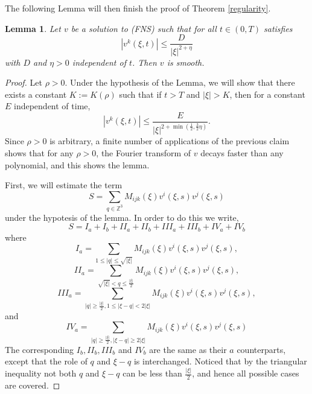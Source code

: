 \documentclass{amsart}
\newtheorem{lemma}{Lemma}
\begin{document}
The following Lemma will then finish the proof of Theorem \ref{regularity}.
\begin{lemma}
Let $v$ be a solution to (FNS) such that for all $t\in \left(0,T\right)$ satisfies
\[
\left|v^k\left(\xi,t\right)\right|\leq \frac{D}{\left|\xi\right|^{2+\eta}}
\]
with $D$ and $\eta>0$ independent of $t$. Then $v$ is smooth.
\end{lemma}
\begin{proof}
Let $\rho>0$. Under the hypothesis of the Lemma,
we will show that there exists a constant $K:=K\left(\rho\right)$ such that
if $t>T$ and $\left|\xi\right|>K$, then for a constant $E$ independent of time,
\[
\left|v^k\left(\xi,t\right)\right|\leq \frac{E}{\left|\xi\right|^{2+\min\left(\frac{1}{2},\frac{3}{2}\eta\right)}}.
\]
Since $\rho>0$ is arbitrary, a finite number of applications of the previous claim shows
that for any $\rho>0$, the Fourier transform of $v$ decays faster than any polynomial, and
this shows the lemma. 

First, we will estimate the term
\[
S=\sum_{q\in \mathbb{Z}^3} M_{ijk}\left(\xi\right)v^i\left(\xi,s\right)v^j\left(\xi,s\right)
\]
under the hypotesis of the lemma. In order to do this we write,
\[
S=I_a+I_b+II_a+II_b+III_a+III_b+IV_a+IV_b
\]
where
\begin{equation*}
I_a=\sum_{1\leq\left|q\right|\leq\sqrt{\left|\xi\right|}}M_{ijk}\left(\xi\right)v^i\left(\xi,s\right)v^j\left(\xi,s\right),
\end{equation*}
\begin{equation*}
II_a=\sum_{\sqrt{\left|\xi\right|}<q\leq \frac{\left|\xi\right|}{2}}
M_{ijk}\left(\xi\right)v^i\left(\xi,s\right)v^j\left(\xi,s\right),
\end{equation*}
\begin{equation*}
III_a=\sum_{\left|q\right|\geq\frac{\left|\xi\right|}{2}, 1\leq\left|\xi-q\right|< 2\left|\xi\right|}
M_{ijk}\left(\xi\right)v^i\left(\xi,s\right)v^j\left(\xi,s\right),
\end{equation*}
and
\begin{equation*}
IV_a=\sum_{\left|q\right|\geq\frac{\left|\xi\right|}{2}, \left|\xi-q\right|\geq 2\left|\xi\right|}
M_{ijk}\left(\xi\right)v^i\left(\xi,s\right)v^j\left(\xi,s\right)
\end{equation*}
The corresponding $I_b,II_b,III_b$ and $IV_b$ are the same as
their $a$ counterparts, except that the role of $q$ and $\xi-q$ is interchanged.
Noticed that by the triangular inequality not both $q$ and $\xi-q$ can be less than $\frac{\left|\xi\right|}{2}$,
and hence all possible cases are covered.


\end{proof}
\end{document}
